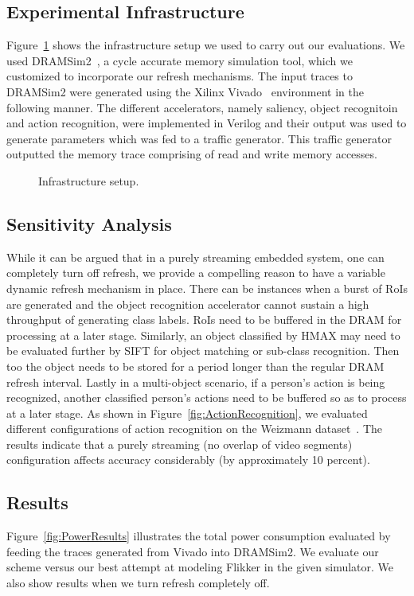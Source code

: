 \subsection{Experimental Infrastructure}
Figure~\ref{fig:experimental-setup} shows the infrastructure setup we used to carry out our evaluations.
We used DRAMSim2~\cite{DRAMsim2}, a cycle accurate memory simulation tool, which we customized to incorporate our refresh mechanisms. 
The input traces to DRAMSim2 were generated using the Xilinx Vivado~\cite{vivado} environment in the following manner.
The different accelerators, namely saliency, object recognitoin and action recognition, were implemented in Verilog and their output was used to generate parameters which was fed to a traffic generator.
This traffic generator outputted the memory trace comprising of read and write memory accesses.

\begin{figure}[ht!]
\centering
{}
\caption{\label{fig:experimental-setup} Infrastructure setup.}
\end{figure}

\subsection{Sensitivity Analysis}
While it can be argued that in a purely streaming embedded system, one can completely turn off refresh, we provide a compelling reason to have a variable dynamic refresh mechanism in place. There can be instances when a burst of RoIs are generated and the object recognition accelerator cannot sustain a high throughput of generating class labels. RoIs need to be buffered in the DRAM for processing at a later stage. Similarly, an object classified by HMAX may need to be evaluated further by SIFT for object matching or sub-class recognition. Then too the object needs to be stored for a period longer than the regular DRAM refresh interval. Lastly in a multi-object scenario, if a person's action is being recognized, another classified person's actions need to be buffered so as to process at a later stage. As shown in Figure~\ref{fig:ActionRecognition}, we evaluated different configurations of action recognition on the Weizmann dataset~\cite{Weizmann}. The results indicate that a purely streaming (no overlap of video segments) configuration affects accuracy considerably (by approximately 10 percent).  

\subsection{Results}
Figure~\ref{fig:PowerResults} illustrates the total power consumption evaluated by feeding the traces generated from Vivado into DRAMSim2. We evaluate our scheme versus our best attempt at modeling Flikker in the given simulator. We also show results when we turn refresh completely off. 

